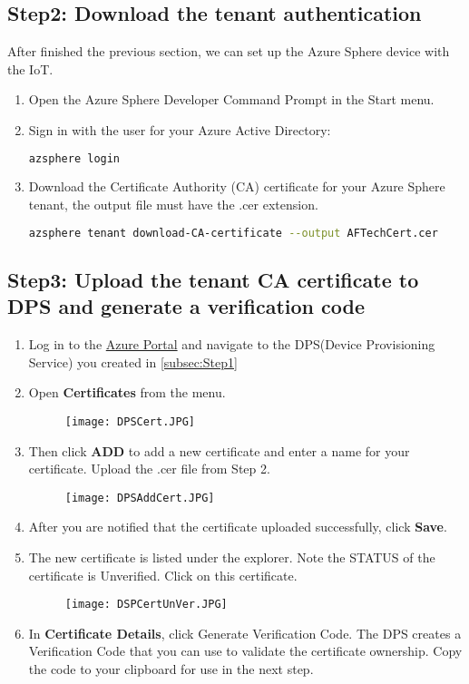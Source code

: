 \subsection{Step2: Download the tenant authentication}
After finished the previous section, we can set up the Azure Sphere device with the IoT.
\begin{enumerate}
    \item Open the Azure Sphere Developer Command Prompt in the Start menu.
    \item Sign in with the user for your Azure Active Directory:
    \begin{lstlisting}[language=bash]
        azsphere login
    \end{lstlisting}
    \item Download the Certificate Authority (CA) certificate for your Azure Sphere tenant, the output file must have the .cer extension.
    \begin{lstlisting}[language=bash]
        azsphere tenant download-CA-certificate --output AFTechCert.cer
    \end{lstlisting}
\end{enumerate}

\subsection{Step3: Upload the tenant CA certificate to DPS and generate a verification code}
\begin{enumerate}
    \item Log in to the \href{https://portal.azure.com}{Azure Portal} and navigate to the  DPS(Device Provisioning Service) you created in \ref{subsec:Step1}
    \item Open \textbf{Certificates} from the menu. 
    \begin{figure}[h]
        \centering
        \texttt{[image: DPSCert.JPG]}
    \end{figure}
    \newpage
    \item Then click \textbf{ADD} to add a new certificate and enter a name for your certificate. Upload the .cer file from Step 2.
    \begin{figure}[h]
        \centering
        \texttt{[image: DPSAddCert.JPG]}
    \end{figure}
    \item After you are notified that the certificate uploaded successfully, click \textbf{Save}.
    \item The new certificate is listed under the explorer. Note the STATUS of the certificate is Unverified. Click on this certificate.
    \begin{figure}[h]
        \centering
        \texttt{[image: DSPCertUnVer.JPG]}
    \end{figure}
    \item In \textbf{Certificate Details}, click Generate Verification Code. The DPS creates a Verification Code that you can use to validate the certificate ownership. Copy the code to your clipboard for use in the next step.
    
\end{enumerate}

